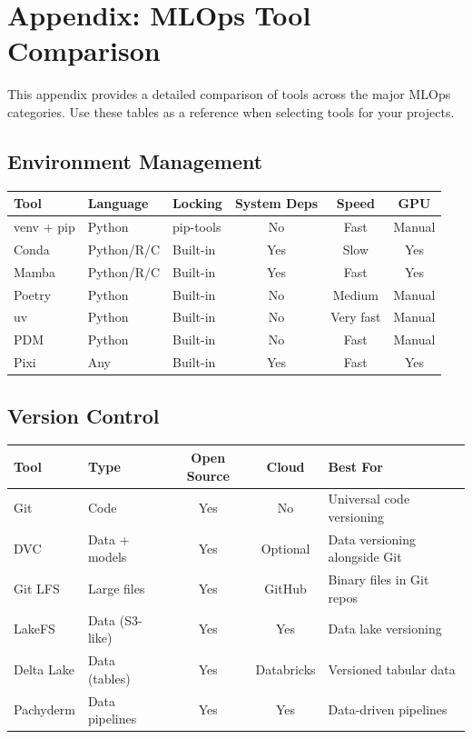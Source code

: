 \chapter{Appendix: MLOps Tool Comparison}
\label{app:tools}

This appendix provides a detailed comparison of tools across the
major MLOps categories. Use these tables as a reference when selecting
tools for your projects.

\section{Environment Management}
\label{app:env-tools}

\begin{center}
\begin{tabular}{@{}lllccc@{}}
\toprule
\textbf{Tool} & \textbf{Language} & \textbf{Locking} &
  \textbf{System Deps} & \textbf{Speed} & \textbf{GPU} \\
\midrule
venv + pip & Python & pip-tools & No & Fast & Manual \\
Conda & Python/R/C & Built-in & Yes & Slow & Yes \\
Mamba & Python/R/C & Built-in & Yes & Fast & Yes \\
Poetry & Python & Built-in & No & Medium & Manual \\
uv & Python & Built-in & No & Very fast & Manual \\
PDM & Python & Built-in & No & Fast & Manual \\
Pixi & Any & Built-in & Yes & Fast & Yes \\
\bottomrule
\end{tabular}
\end{center}

\section{Version Control}
\label{app:vc-tools}

\begin{center}
\begin{tabular}{@{}llccp{4.5cm}@{}}
\toprule
\textbf{Tool} & \textbf{Type} & \textbf{Open Source} &
  \textbf{Cloud} & \textbf{Best For} \\
\midrule
Git & Code & Yes & No & Universal code versioning \\
DVC & Data + models & Yes & Optional & Data versioning alongside Git \\
Git LFS & Large files & Yes & GitHub & Binary files in Git repos \\
LakeFS & Data (S3-like) & Yes & Yes & Data lake versioning \\
Delta Lake & Data (tables) & Yes & Databricks & Versioned tabular data \\
Pachyderm & Data pipelines & Yes & Yes & Data-driven pipelines \\
\bottomrule
\end{tabular}
\end{center}

